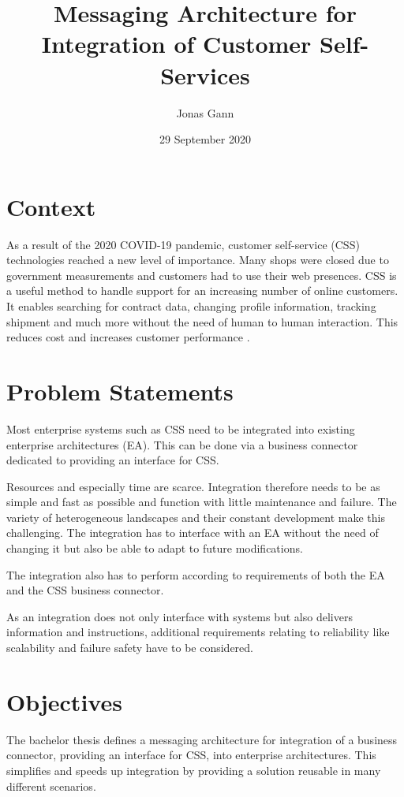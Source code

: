 \documentclass{article}
\title{Messaging Architecture for Integration of Customer Self-Services}
\author{Jonas Gann}
\date{29 September 2020}
\begin{document}
\maketitle

\section{Context}
As a result of the 2020 COVID-19 pandemic, customer self-service (CSS) technologies reached a new level of importance.
Many shops were closed due to government measurements and customers had to use their web
presences. CSS is a useful method to handle support for an increasing number of online customers. It enables searching
for contract data, changing profile information, tracking shipment and much more without the need of human to human interaction.
This reduces cost and increases customer performance \cite{covid}.

\section{Problem Statements}

Most enterprise systems such as CSS need to be integrated into existing enterprise architectures (EA).
This can be done via a business connector dedicated to providing an interface for CSS. 

Resources and especially time are scarce. Integration therefore needs to be as simple and fast as possible and 
function with little maintenance and failure. The variety of heterogeneous landscapes and their constant 
development make this challenging. The integration has to interface with an EA without the need of changing it but also be able to 
adapt to future modifications.

The integration also has to perform according to requirements of both the EA and the CSS business connector.

As an integration does not only interface with systems but also delivers information and instructions, additional requirements 
relating to reliability like scalability and failure safety have to be considered.

\section{Objectives}

The bachelor thesis defines a messaging architecture for integration of a business connector, providing an interface for CSS,  
into enterprise architectures. This simplifies and speeds up integration by providing a solution reusable in many 
different scenarios.
\end{document}
